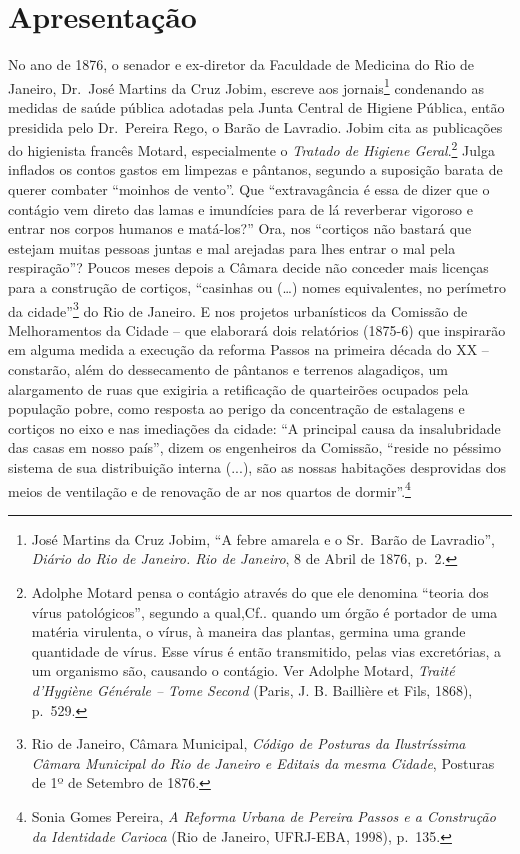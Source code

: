 \chapter{Apresentação}\label{apresentauxe7uxe3o}

No ano de 1876, o senador e ex-diretor da Faculdade de Medicina do Rio
de Janeiro, Dr.~José Martins da Cruz Jobim, escreve aos
jornais\footnote{José Martins da Cruz Jobim, ``A febre amarela e o
  Sr.~Barão de Lavradio'', \emph{Diário do Rio de Janeiro. Rio de
  Janeiro}, 8 de Abril de 1876, p.~2.} condenando as medidas de saúde
pública adotadas pela Junta Central de Higiene Pública, então presidida
pelo Dr.~Pereira Rego, o Barão de Lavradio. Jobim cita as publicações do
higienista francês Motard, especialmente o \emph{Tratado de Higiene
Geral}.\footnote{Adolphe Motard pensa o contágio através do que ele
  denomina ``teoria dos vírus patológicos'', segundo a qual,Cf.. quando
  um órgão é portador de uma matéria virulenta, o vírus, à maneira das
  plantas, germina uma grande quantidade de vírus. Esse vírus é então
  transmitido, pelas vias excretórias, a um organismo são, causando o
  contágio. Ver Adolphe Motard, \emph{Traité d'Hygiène Générale -- Tome
  Second} (Paris, J. B. Baillière et Fils, 1868), p.~529.} Julga
inflados os contos gastos em limpezas e pântanos, segundo a suposição
barata de querer combater ``moinhos de vento''. Que ``extravagância é
essa de dizer que o contágio vem direto das lamas e imundícies para de
lá reverberar vigoroso e entrar nos corpos humanos e matá-los?'' Ora,
nos ``cortiços não bastará que estejam muitas pessoas juntas e mal
arejadas para lhes entrar o mal pela respiração''? Poucos meses depois a
Câmara decide não conceder mais licenças para a construção de cortiços,
``casinhas ou (\ldots{}) nomes equivalentes, no perímetro da
cidade''\footnote{Rio de Janeiro, Câmara Municipal, \emph{Código de
  Posturas da Ilustríssima Câmara Municipal do Rio de Janeiro e Editais
  da mesma Cidade}, Posturas de 1º de Setembro de 1876.} do Rio de
Janeiro. E nos projetos urbanísticos da Comissão de Melhoramentos da
Cidade -- que elaborará dois relatórios (1875-6) que inspirarão em
alguma medida a execução da reforma Passos na primeira década do XX --
constarão, além do dessecamento de pântanos e terrenos alagadiços, um
alargamento de ruas que exigiria a retificação de quarteirões ocupados
pela população pobre, como resposta ao perigo da concentração de
estalagens e cortiços no eixo e nas imediações da cidade: ``A principal
causa da insalubridade das casas em nosso país'', dizem os engenheiros
da Comissão, ``reside no péssimo sistema de sua distribuição interna
(...), são as nossas habitações desprovidas dos meios de ventilação e de
renovação de ar nos quartos de dormir''.\footnote{Sonia Gomes Pereira,
  \emph{A Reforma Urbana de Pereira Passos e a Construção da Identidade
  Carioca} (Rio de Janeiro, UFRJ-EBA, 1998), p.~135.}

